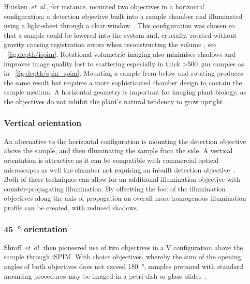 Huisken~\emph{et~al.}, for instance, mounted two objectives in a horizontal configuration; a detection objective built into a sample chamber and illuminated using a \gls{light-sheet} through a clear window~\cite{huiskenOpticalSectioningDeep2004}.
This configuration was chosen so that a sample could be lowered into the system and, crucially, rotated without gravity causing registration errors when reconstructing the volume , see \figurename~\ref{fig:depth/ispim}.
Rotational volumetric imaging also minimises shadows and improves image quality lost to scattering especially in thick \SI{>500}{\micro\meter} samples as in \figurename~\ref{fig:depth/spin_spim}.
Mounting a sample from below and rotating produces the same result but requires a more sophisticated chamber design to contain the sample medium.
A horizontal geometry is important for imaging plant biology, as the objectives do not inhibit the plant's natural tendency to grow upright~\cite{wangenheimRulesSelfOrganizingProperties2016}. %

\subsubsection{Vertical orientation}

An alternative to the horizontal configuration is mounting the detection objective above the sample, and then illuminating the sample from the side.
A vertical orientation is attractive as it can be compatible with commercial optical microscopes as well the chamber not requiring an inbuilt detection objective~\cite{ALEKS 29 30}.
Both of these techniques can allow for an additional illumination objective with counter-propagating illumination.
By offsetting the foci of the illumination objectives along the axis of propagation an overall more homogenous illumination profile can be created, with reduced shadows.

\subsubsection{\SI{45}{\degree} orientation}

Shroff~\emph{et~al.} then pioneered use of two objectives in a V configuration above the sample through \gls{iSPIM}.
With choice objectives, whereby the sum of the opening angles of both objectives does not exceed \SI{180}{\degree},
samples prepared with standard mounting procedures may be imaged in a petri-dish or glass~slides~\cite{kumarDualViewPlaneIllumination2014}.

